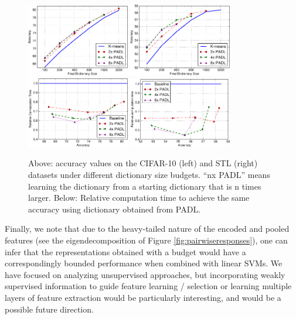 \begin{figure}
    \centering
    \includegraphics[width=0.4\textwidth]{figs/sizematters/cifar_accuracy.pdf}
    \includegraphics[width=0.4\textwidth]{figs/sizematters/stl_accuracy.pdf}\\
    \includegraphics[width=0.4\textwidth]{figs/sizematters/cifar_speedup.pdf}
    \includegraphics[width=0.4\textwidth]{figs/sizematters/stl_speedup.pdf}
    \caption{Above: accuracy values on the CIFAR-10 (left) and STL (right) datasets under different dictionary size budgets. ``nx PADL'' means learning the dictionary from a starting dictionary that is n times larger. Below: Relative computation time to achieve the same accuracy using dictionary obtained from PADL.}\label{fig:cifarstl}
\end{figure}

Finally, we note that due to the heavy-tailed nature of the encoded and pooled features (see the eigendecomposition of Figure \ref{fig:pairwiseresponses}), one can infer that the representations obtained with a budget would have a correspondingly bounded performance when combined with linear SVMs. We have focused on analyzing unsupervised approaches, but incorporating weakly supervised information to guide feature learning / selection or learning multiple layers of feature extraction would be particularly interesting, and would be a possible future direction.


